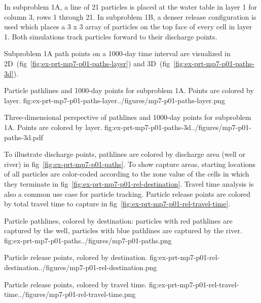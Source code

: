 In subproblem 1A, a line of 21 particles is placed at the water table in layer 1 for column 3, rows 1 through 21. In subproblem 1B, a denser release configuration is used which places a 3 x 3 array of particles on the top face of every cell in layer 1. Both simulations track particles forward to their discharge points.

Subproblem 1A path points on a 1000-day time interval are visualized in 2D~(fig~\ref{fig:ex-prt-mp7-p01-paths-layer}) and 3D~(fig~\ref{fig:ex-prt-mp7-p01-paths-3d}).

\begin{StandardFigure}{
    Particle pathlines and 1000-day points for subproblem 1A. Points are colored by layer.
    }{fig:ex-prt-mp7-p01-paths-layer}{../figures/mp7-p01-paths-layer.png}
\end{StandardFigure}

\begin{StandardFigure}{
    Three-dimensional perspective of pathlines and 1000-day points for subproblem 1A. Points are colored by layer.
    }{fig:ex-prt-mp7-p01-paths-3d}{../figures/mp7-p01-paths-3d.pdf}
\end{StandardFigure}

To illustrate discharge points, pathlines are colored by discharge area (well or river) in fig~\ref{fig:ex-prt-mp7-p01-paths}. To show capture areas, starting locations of all particles are color-coded according to the zone value of the cells in which they terminate in fig~\ref{fig:ex-prt-mp7-p01-rel-destination}. Travel time analysis is also a common use case for particle tracking. Particle release points are colored by total travel time to capture in fig~\ref{fig:ex-prt-mp7-p01-rel-travel-time}.

\begin{StandardFigure}{
    Particle pathlines, colored by destination: particles with red pathlines are captured by the well, particles with blue pathlines are captured by the river.
    }{fig:ex-prt-mp7-p01-paths}{../figures/mp7-p01-paths.png}
\end{StandardFigure}

\begin{StandardFigure}{
    Particle release points, colored by destination.
    }{fig:ex-prt-mp7-p01-rel-destination}{../figures/mp7-p01-rel-destination.png}
\end{StandardFigure}

\begin{StandardFigure}{
    Particle release points, colored by travel time.
    }{fig:ex-prt-mp7-p01-rel-travel-time}{../figures/mp7-p01-rel-travel-time.png}
\end{StandardFigure}